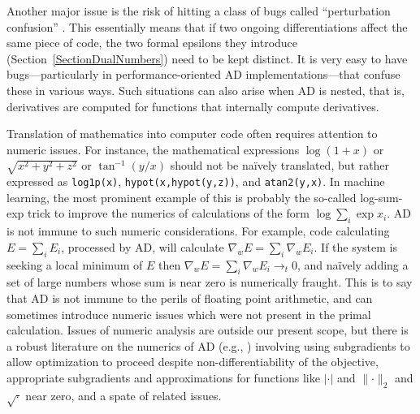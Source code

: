 \documentclass[twoside,11pt]{article}
\begin{document}
Another major issue is the risk of hitting a class of bugs called ``perturbation confusion'' \citep{SiskindPearlmutter2005a,manzyuk2012confusion}. This essentially means that if two ongoing differentiations affect the same piece of code, the two formal epsilons they introduce (Section~\ref{SectionDualNumbers}) need to be kept distinct. It is very easy to have bugs---particularly in performance-oriented AD implementations---that confuse these in various ways. Such situations can also arise when AD is nested, that is, derivatives are computed for functions that internally compute derivatives.

Translation of mathematics into computer code often requires attention to numeric issues.  For instance, the mathematical expressions $\log(1 + x)$ or $\sqrt{x^2+y^2+z^2}$ or $\tan^{-1}(y/x)$ should not be naïvely translated, but rather expressed as \texttt{log1p(x)}, \texttt{hypot(x,hypot(y,z))}, and \texttt{atan2(y,x)}.  In machine learning, the most prominent example of this is probably the so-called log-sum-exp trick to improve the numerics of calculations of the form $\log\sum_i \exp x_i$.  AD is not immune to such numeric considerations. For example, code calculating $E=\sum_i E_i$, processed by AD, will calculate $\nabla_w E=\sum_i\nabla_w E_i$. If the system is seeking a local minimum of $E$ then $\nabla_w E = \sum_i\nabla_w E_i \rightarrow_t 0$, and naïvely adding a set of large numbers whose sum is near zero is numerically fraught.  This is to say that AD is not immune to the perils of floating point arithmetic, and can sometimes introduce numeric issues which were not present in the primal calculation.  Issues of numeric analysis are outside our present scope, but there is a robust literature on the numerics of AD (e.g., \citet{griewank2012numerical}) involving using subgradients to allow optimization to proceed despite non-differentiability of the objective, appropriate subgradients and approximations for functions like $\lvert \cdot \rvert$ and $\lVert\cdot\rVert_2$ and $\sqrt{\cdot}$ near zero, and a spate of related issues.
\end{document}

